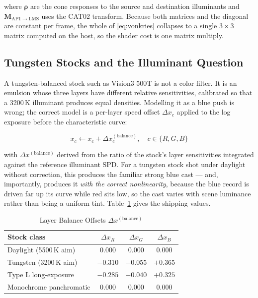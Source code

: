 where $\boldsymbol{\rho}$ are the cone responses to the source and destination
illuminants and $\mathbf{M}_{\mathrm{AP1}\to\mathrm{LMS}}$ uses the CAT02
\cite{cie159}
transform. Because both matrices and the diagonal are constant per frame, the
whole of \eqref{eq:vonkries} collapses to a single $3\times3$ matrix computed on
the host, so the shader cost is one matrix multiply.

\subsection{Tungsten Stocks and the Illuminant Question}

A tungsten-balanced stock such as Vision3 500T is not a color filter. It is an
emulsion whose three layers have different relative sensitivities, calibrated so
that a 3200\,K illuminant produces equal densities. Modelling it as a blue push
is wrong; the correct model is a per-layer speed offset $\Delta x_c$ applied to
the log exposure before the characteristic curve:

\begin{equation}
x_c \leftarrow x_c + \Delta x_c^{\mathrm{(balance)}}, \quad c \in \{R,G,B\}
\label{eq:tungsten}
\end{equation}

with $\Delta x^{\mathrm{(balance)}}$ derived from the ratio of the stock's
layer sensitivities integrated against the reference illuminant SPD. For a
tungsten stock shot under daylight without correction, this produces the
familiar strong blue cast --- and, importantly, produces it \emph{with the
correct nonlinearity}, because the blue record is driven far up its curve while
red sits low, so the cast varies with scene luminance rather than being a
uniform tint. Table~\ref{tab:balance} gives the shipping values.

\begin{table}[htbp]
\caption{Layer Balance Offsets $\Delta x^{\mathrm{(balance)}}$}
\label{tab:balance}
\begin{center}
\renewcommand{\arraystretch}{1.15}
\begin{tabular}{@{}lccc@{}}
\toprule
\textbf{Stock class} & $\Delta x_R$ & $\Delta x_G$ & $\Delta x_B$ \\
\midrule
Daylight (5500\,K aim)  & $0.000$ & $0.000$ & $0.000$ \\
Tungsten (3200\,K aim)  & $-0.310$ & $-0.055$ & $+0.365$ \\
Type L long-exposure    & $-0.285$ & $-0.040$ & $+0.325$ \\
Monochrome panchromatic & $0.000$ & $0.000$ & $0.000$ \\
\bottomrule
\end{tabular}
\end{center}
\end{table}
